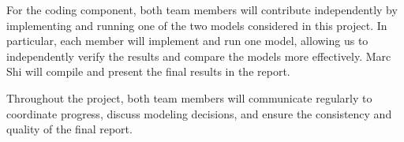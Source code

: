 \documentclass[a4paper,11pt]{article}
\begin{document}
For the coding component, both team members will contribute independently by implementing and running one of the two models considered in this project. In particular, each member will implement and run one model, allowing us to independently verify the results and compare the models more effectively. Marc Shi will compile and present the final results in the report.

Throughout the project, both team members will communicate regularly to coordinate progress, discuss modeling decisions, and ensure the consistency and quality of the final report.


\clearpage

\end{document}

